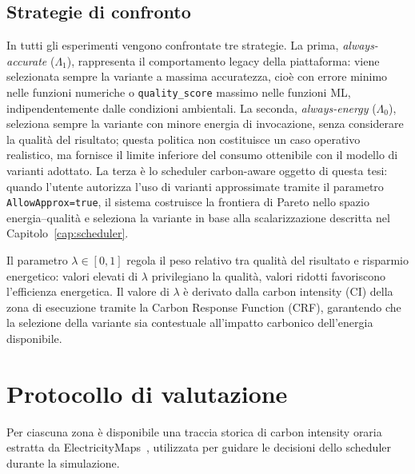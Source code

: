 \subsection{Strategie di confronto}
\label{subsec:strategie-confronto}

In tutti gli esperimenti vengono confrontate tre strategie. La prima,
\emph{always-accurate} ($\Lambda_1$), rappresenta il comportamento legacy
della piattaforma: viene selezionata sempre la variante a massima
accuratezza, cioè con errore minimo nelle funzioni numeriche o
\texttt{quality\_score} massimo nelle funzioni ML, indipendentemente dalle
condizioni ambientali. La seconda, \emph{always-energy} ($\Lambda_0$),
seleziona sempre la variante con minore energia di invocazione, senza
considerare la qualità del risultato; questa politica non costituisce un
caso operativo realistico, ma fornisce il limite inferiore del consumo
ottenibile con il modello di varianti adottato. La terza è lo scheduler
carbon-aware oggetto di questa tesi: quando l'utente
autorizza l'uso di varianti approssimate tramite il parametro
\texttt{AllowApprox=true}, il sistema costruisce la frontiera di Pareto
nello spazio energia--qualità e seleziona la variante in base alla
scalarizzazione descritta nel Capitolo~\ref{cap:scheduler}.

Il parametro $\lambda \in [0,1]$ regola il peso relativo tra qualità del
risultato e risparmio energetico: valori elevati di $\lambda$ privilegiano
la qualità, valori ridotti favoriscono l'efficienza energetica. Il valore
di $\lambda$ è derivato dalla carbon intensity (CI) della zona di esecuzione
tramite la Carbon Response Function (CRF), garantendo che la selezione della variante
sia contestuale all'impatto carbonico dell'energia disponibile.

\section{Protocollo di valutazione}
\label{sec:protocollo-valutazione}

Per ciascuna zona è disponibile una traccia storica di carbon intensity
oraria estratta da ElectricityMaps~\cite{electricitymaps2024}, utilizzata
per guidare le decisioni dello scheduler durante la simulazione.

